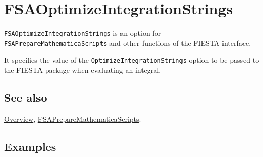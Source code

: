 \documentclass[../FeynHelpersManual.tex]{subfiles}
\begin{document}
\hypertarget{fsaoptimizeintegrationstrings}{
\section{FSAOptimizeIntegrationStrings}\label{fsaoptimizeintegrationstrings}}

\texttt{FSAOptimizeIntegrationStrings} is an option for
\texttt{FSAPrepareMathematicaScripts} and other functions of the FIESTA
interface.

It specifies the value of the \texttt{OptimizeIntegrationStrings} option
to be passed to the FIESTA package when evaluating an integral.

\subsection{See also}

\hyperlink{toc}{Overview},
\hyperlink{fsapreparemathematicascripts}{FSAPrepareMathematicaScripts}.

\subsection{Examples}
\end{document}
